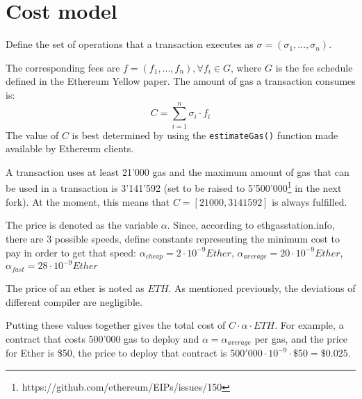 \section{Cost model}

Define the set of operations that a transaction executes as $ \sigma = (\sigma_1, ..., \sigma_n) $.

The corresponding fees are $ f = (f_1, ..., f_n), \forall f_i \in G $, where $ G $ is the fee schedule defined in the Ethereum Yellow paper. The amount of gas a transaction consumes is: \[ C = \sum_{i = 1}^n \sigma_i \cdot f_i \] The value of $ C $ is best determined by using the \texttt{estimateGas()} function made available by Ethereum clients.

A transaction uses at least 21'000 gas and the maximum amount of gas that can be used in a transaction is 3'141'592 (set to be raised to 5'500'000\footnote{https://github.com/ethereum/EIPs/issues/150} in the next fork). At the moment, this means that $ C = [21000, 3141592] $ is always fulfilled.

The price is denoted as the variable $ \alpha $. Since, according to ethgasstation.info, there are 3 possible speeds, define constants representing the minimum cost  to pay in order to get that speed: $ \alpha_{cheap} = 2 \cdot 10^{-9} Ether $, $ \alpha_{average} = 20 \cdot 10^{-9} Ether $, $ \alpha_{fast} = 28 \cdot 10^{-9} Ether $

The price of an ether is noted as $ ETH $. As mentioned previously, the deviations of different compiler are negligible.

Putting these values together gives the total cost of $ C \cdot \alpha \cdot ETH $. For example, a contract that costs 500'000 gas to deploy and $ \alpha = \alpha_{average} $ per gas, and the price for Ether is \$50, the price to deploy that contract is $ 500'000 \cdot 10^{-9} \cdot \$50 = \$0.025 $.
